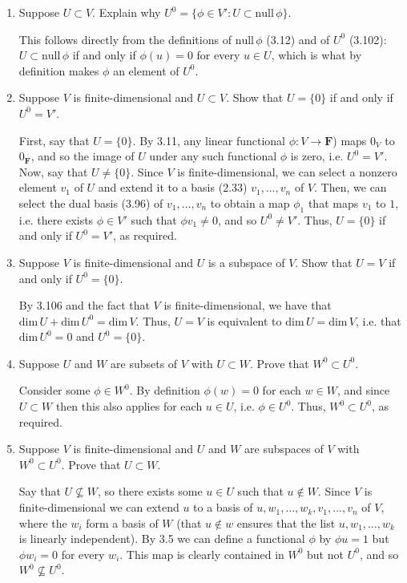 \documentclass{book}
\begin{document}
\begin{enumerate}
\item Suppose \(U \subset V\).  Explain why \(U^0 = \{\phi \in V':U \subset \textrm{null} \, \phi \}\).

This follows directly from the definitions of \(\textrm{null} \, \phi\) (3.12) and of \(U^0\) (3.102): \(U \subset \textrm{null} \, \phi\) if and only if \(\phi(u)=0\) for every \(u \in U\), which is what by definition makes \(\phi\) an element of \(U^0\).

\item Suppose \(V\) is finite-dimensional and \(U \subset V\).  Show that \(U=\{0\}\) if and only if \(U^0 = V'\).

First, say that \(U=\{0\}\).  By 3.11, any linear functional \(\phi:V \rightarrow \textbf{F}\)) maps \(0_V\) to \(0_{\textbf{F}}\), and so the image of \(U\) under any such functional \(\phi\) is zero, i.e. \(U^0=V'\).  Now, say that \(U \neq \{0\}\).  Since \(V\) is finite-dimensional, we can select a nonzero element \(v_1\) of \(U\) and extend it to a basis (2.33) \(v_1,\dots,v_n\) of \(V\).  Then, we can select the dual basis (3.96) of \(v_1,\dots,v_n\) to obtain a map \(\phi_1\) that maps \(v_1\) to \(1\), i.e. there exists \(\phi \in V'\) such that \(\phi v_1 \neq 0\), and so \(U^0 \neq V'\).  Thus, \(U=\{0\}\) if and only if \(U^0 = V'\), as required.

\item Suppose \(V\) is finite-dimensional and \(U\) is a subspace of \(V\).  Show that \(U=V\) if and only if \(U^0=\{0\}\).

By 3.106 and the fact that \(V\) is finite-dimensional, we have that \(\textrm{dim} \, U + \textrm{dim} \, U^0=\textrm{dim} \, V\).  Thus, \(U=V\) is equivalent to \(\textrm{dim} \, U = \textrm{dim} \, V\), i.e. that \(\textrm{dim} \, U^0 = 0\) and \(U^0=\{0\}\).

\item Suppose \(U\) and \(W\) are subsets of \(V\) with \(U \subset W\).  Prove that \(W^0 \subset U^0\).

Consider some \(\phi \in W^0\).  By definition \(\phi(w)=0\) for each \(w \in W\), and since \(U \subset W\) then this also applies for each \(u \in U\), i.e. \(\phi \in U^0\).  Thus, \(W^0 \subset U^0\), as required.

\item Suppose \(V\) is finite-dimensional and \(U\) and \(W\) are subspaces of \(V\) with \(W^0 \subset U^0\).  Prove that \(U \subset W\).

Say that \(U \nsubseteq W\), so there exists some \(u \in U\) such that \(u \notin W\).  Since \(V\) is finite-dimensional we can extend \(u\) to a basis of \(u,w_1,\dots,w_k,v_1,\dots,v_n\) of \(V\), where the \(w_i\) form a basis of \(W\) (that \(u \notin w\) ensures that the list \(u,w_1,\dots,w_k\) is linearly independent).  By 3.5 we can define a functional \(\phi\) by \(\phi u=1\) but \(\phi w_i=0\) for every \(w_i\).  This map is clearly contained in \(W^0\) but not \(U^0\), and so \(W^0 \nsubseteq U^0\).


\end{enumerate}
\end{document}
